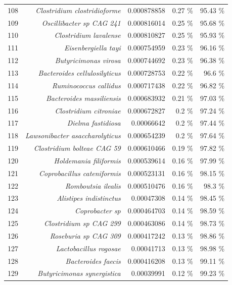 \documentclass{article}
\begin{document}
\begin{table}
\begin{tabular}{|r|r|r|r|r|}
      108 & \textit{Clostridium clostridioforme} & 0.000878858 & 0.27 \% & 95.43 \% \\
      109 & \textit{Oscillibacter sp CAG 241} & 0.000816014 & 0.25 \% & 95.68 \% \\
      110 & \textit{Clostridium lavalense} & 0.000810827 & 0.25 \% & 95.93 \% \\
      111 & \textit{Eisenbergiella tayi} & 0.000754959 & 0.23 \% & 96.16 \% \\
      112 & \textit{Butyricimonas virosa} & 0.000744692 & 0.23 \% & 96.38 \% \\
      113 & \textit{Bacteroides cellulosilyticus} & 0.000728753 & 0.22 \% & 96.6 \% \\
      114 & \textit{Ruminococcus callidus} & 0.000717438 & 0.22 \% & 96.82 \% \\
      115 & \textit{Bacteroides massiliensis} & 0.000683932 & 0.21 \% & 97.03 \% \\
      116 & \textit{Clostridium citroniae} & 0.000672827 & 0.2 \% & 97.24 \% \\
      117 & \textit{Dielma fastidiosa} & 0.00066642 & 0.2 \% & 97.44 \% \\
      118 & \textit{Lawsonibacter asaccharolyticus} & 0.000654239 & 0.2 \% & 97.64 \% \\
      119 & \textit{Clostridium bolteae CAG 59} & 0.000610466 & 0.19 \% & 97.82 \% \\
      120 & \textit{Holdemania filiformis} & 0.000539614 & 0.16 \% & 97.99 \% \\
      121 & \textit{Coprobacillus cateniformis} & 0.000523131 & 0.16 \% & 98.15 \% \\
      122 & \textit{Romboutsia ilealis} & 0.000510476 & 0.16 \% & 98.3 \% \\
      123 & \textit{Alistipes indistinctus} & 0.00047308 & 0.14 \% & 98.45 \% \\
      124 & \textit{Coprobacter sp} & 0.000464703 & 0.14 \% & 98.59 \% \\
      125 & \textit{Clostridium sp CAG 299} & 0.000463086 & 0.14 \% & 98.73 \% \\
      126 & \textit{Roseburia sp CAG 309} & 0.000417242 & 0.13 \% & 98.86 \% \\
      127 & \textit{Lactobacillus rogosae} & 0.00041713 & 0.13 \% & 98.98 \% \\
      128 & \textit{Bacteroides faecis} & 0.000416208 & 0.13 \% & 99.11 \% \\
      129 & \textit{Butyricimonas synergistica} & 0.00039991 & 0.12 \% & 99.23 \% \\

\end{tabular}
\end{table}
\end{document}
